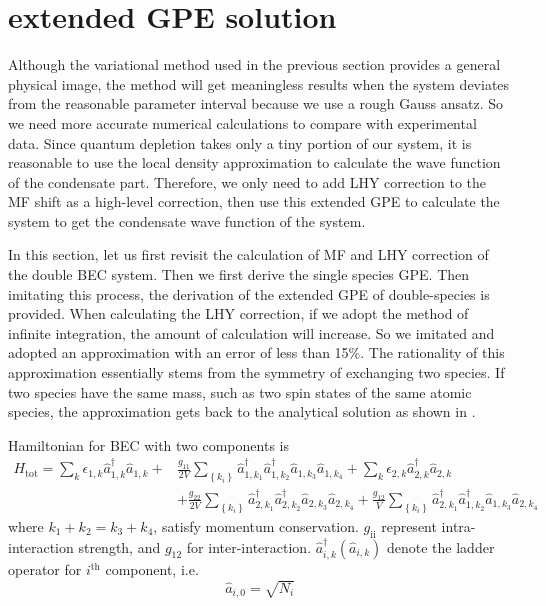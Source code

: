 \section{extended GPE solution}
\label{sec:eGPE}

Although the variational method used in the previous section provides a general physical image, the method will get meaningless results when the system deviates from the reasonable parameter interval because we use a rough Gauss ansatz. So we need more accurate numerical calculations to compare with experimental data. Since quantum depletion takes only a tiny portion of our system, it is reasonable to use the local density approximation to calculate the wave function of the condensate part. Therefore, we only need to add LHY correction to the MF shift as a high-level correction, then use this extended GPE to calculate the system to get the condensate wave function of the system.

In this section, let us first revisit the calculation of MF and LHY correction of the double BEC system. Then we first derive the single species GPE. Then imitating this process, the derivation of the extended GPE of double-species is provided. When calculating the LHY correction, if we adopt the method of infinite integration, the amount of calculation will increase. So we imitated \cite{Minardi2019} and adopted an approximation with an error of less than 15\%. The rationality of this approximation essentially stems from the symmetry of exchanging two species. If two species have the same mass, such as two spin states of the same atomic species, the approximation gets back to the analytical solution as shown in \cite{petrov2015}.

Hamiltonian for BEC with two components is
\begin{equation}
\begin{split}
H_{\text{tot}}=\sum_k\epsilon_{1,k}\hat{a}_{1,k}^\dagger\hat{a}_{1,k}+&\frac{g_{11}}{2V}\sum_{\left\{k_i\right\}}\hat{a}_{1,k_1}^\dagger\hat{a}_{1,k_2}^\dagger\hat{a}_{1,k_3}\hat{a}_{1,k_4}+\sum_k\epsilon_{2,k}\hat{a}_{2,k}^\dagger\hat{a}_{2,k}\\
&+\frac{g_{22}}{2V}\sum_{\left\{k_i\right\}}\hat{a}_{2,k_1}^\dagger\hat{a}_{2,k_2}^\dagger\hat{a}_{2,k_3}\hat{a}_{2,k_4}+\frac{g_{12}}{V}\sum_{\left\{k_i\right\}}\hat{a}_{2,k_1}^\dagger\hat{a}_{1,k_2}^\dagger\hat{a}_{1,k_3}\hat{a}_{2,k_4}
\end{split}
\end{equation}
where $k_1+k_2=k_3+k_4$, satisfy momentum conservation. $g_{\text{ii}}$ represent intra-interaction strength, and $g_{12}$ for inter-interaction. $\hat{a}_{i,k}^\dagger(\hat{a}_{i,k})$ denote the ladder operator for $i^{\text{th}}$ component, i.e. 
\begin{equation}
\hat{a}_{i,0}=\sqrt{N_i}
\end{equation}

